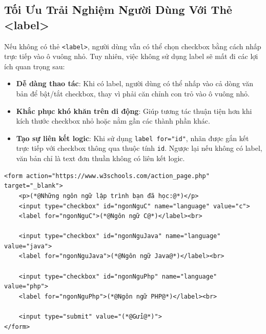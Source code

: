 \documentclass[11pt,oneside]{book}
\newcommand{\codeinline}[1]{\textcolor{accentOrange}{\texttt{#1}}}
\begin{document}
\subsection{Tối Ưu Trải Nghiệm Người Dùng Với Thẻ <label>}

Nếu không có thẻ \codeinline{<label>}, người dùng vẫn có thể chọn checkbox bằng cách nhấp trực tiếp vào ô vuông nhỏ. Tuy nhiên, việc không sử dụng label sẽ mất đi các lợi ích quan trọng sau:
\begin{itemize}[leftmargin=1.5em, itemsep=2pt, parsep=0pt]
    \item \textbf{Dễ dàng thao tác}: Khi có label, người dùng có thể nhấp vào cả dòng văn bản để bật/tắt checkbox, thay vì phải căn chỉnh con trỏ vào ô vuông nhỏ.
    \item \textbf{Khắc phục khó khăn trên di động}: Giúp tương tác thuận tiện hơn khi kích thước checkbox nhỏ hoặc nằm gần các thành phần khác.
    \item \textbf{Tạo sự liên kết logic}: Khi sử dụng \codeinline{label for="id"}, nhãn được gắn kết trực tiếp với checkbox thông qua thuộc tính \codeinline{id}. Ngược lại nếu không có label, văn bản chỉ là text đơn thuần không có liên kết logic.
\end{itemize}

\begin{codeWindow}
\begin{lstlisting}[language=HTML5]
<form action="https://www.w3schools.com/action_page.php" target="_blank">
    <p>(*@Những ngôn ngữ lập trình bạn đã học:@*)</p>
    <input type="checkbox" id="ngonNguC" name="language" value="c">
    <label for="ngonNguC">(*@Ngôn ngữ C@*)</label><br>
    
    <input type="checkbox" id="ngonNguJava" name="language" value="java">
    <label for="ngonNguJava">(*@Ngôn ngữ Java@*)</label><br>
    
    <input type="checkbox" id="ngonNguPhp" name="language" value="php">
    <label for="ngonNguPhp">(*@Ngôn ngữ PHP@*)</label><br>
    
    <input type="submit" value="(*@Gửi@*)">
</form>
\end{lstlisting}
\end{codeWindow}
\end{document}
